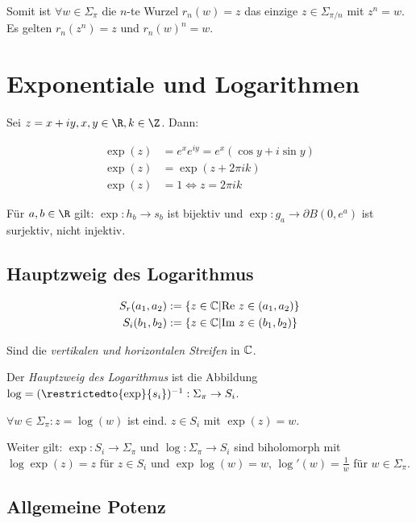Somit ist $\forall w \in \Sigma_\pi$ die $n$-te Wurzel $r_n(w) = z$ das einzige $z \in \Sigma_{\pi/n}$ mit $z^n = w$. Es gelten $r_n(z^n) = z$ und $r_n(w)^n = w$.

\section*{Exponentiale und Logarithmen}

Sei $z = x + iy, x, y \in \R, k \in \Z$. Dann:

\vspace*{-4mm}
\begin{align*}
	\exp(z) &= e^x e^{iy} = e^x(\cos y + i \sin y) \\
	\exp(z) &= \exp(z+2\pi ik) \\
	\exp(z) &= 1 \iff z=2\pi i k
\end{align*}

Für $a, b \in \R$ gilt: $\exp : h_b \to s_b$ ist bijektiv und $\exp : g_a \to \partial B(0,e^a)$ ist surjektiv, nicht injektiv.

\subsection*{Hauptzweig des Logarithmus}

\vspace*{-4mm}
\begin{align*}
	S_r(a_1,a_2) &:= \{ z \in \mathbb{C} | \text{Re } z \in (a_1,a_2) \} \\
	S_i(b_1,b_2) &:= \{ z \in \mathbb{C} | \text{Im } z \in (b_1,b_2) \}
\end{align*}
\vspace*{-6mm}

Sind die \emph{vertikalen und horizontalen Streifen} in $\mathbb{C}$.

\spacing

Der \emph{Hauptzweig des Logarithmus} ist die Abbildung $\log = (\restrictedto{\exp}{s_i})^{-1} : \Sigma_\pi \to S_i$.

$\forall w \in \Sigma_\pi : z = \log(w)$ ist eind. $z \in S_i$ mit $\exp(z) = w$.

Weiter gilt: $\exp : S_i \to \Sigma_\pi$ und $\log : \Sigma_\pi \to S_i$ sind biholomorph mit $\log\exp(z) = z$ für $z \in S_i$ und $\exp\log(w) = w$, $\log'(w) = \frac{1}{w}$ für $w \in \Sigma_\pi$.

\subsection*{Allgemeine Potenz}


